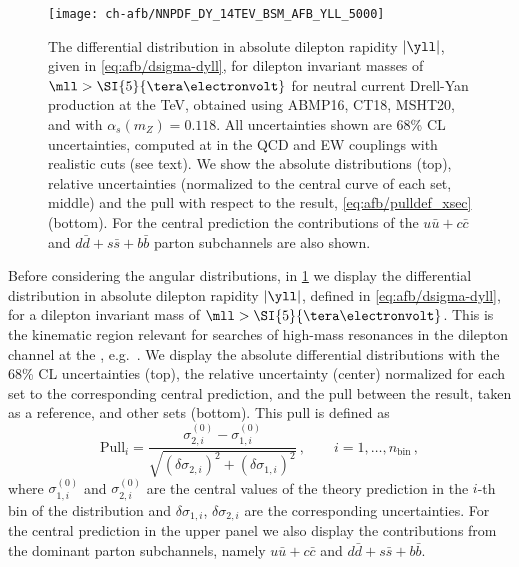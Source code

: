 \begin{figure}[!t]
 \centering
 \texttt{[image: ch-afb/NNPDF\_DY\_14TEV\_BSM\_AFB\_YLL\_5000]}
 \caption{The differential distribution in absolute dilepton rapidity $|\yll|$, given in
\cref{eq:afb/dsigma-dyll},
for dilepton invariant masses of $\mll > \SI{5}{\tera\electronvolt}$
for neutral current Drell-Yan production at the
 TeV,
obtained using ABMP16, CT18, MSHT20, and  \nnlo \pdfs with $\alpha_s(m_Z)=0.118$.
%
All
uncertainties shown are 68\% CL \pdf uncertainties, computed at \nlo
in the QCD and EW couplings with realistic cuts (see text).
We show the absolute distributions (top), relative uncertainties (normalized
to the central curve of each set, middle) and the pull with respect to the
 result, \cref{eq:afb/pulldef_xsec} (bottom).
%
For the central  prediction
the contributions of the $u\bar{u}+c\bar{c}$ and $d\bar{d}+s\bar{s}+b\bar{b}$
parton subchannels are also shown.
 \label{fig:afb/CMS_DY_14TEV_MLL_5000_rap}}
\end{figure}

Before considering the angular distributions, in
\cref{fig:afb/CMS_DY_14TEV_MLL_5000_rap} we display the 
differential distribution in absolute dilepton rapidity $|\yll|$,
defined in \cref{eq:afb/dsigma-dyll},
for a dilepton invariant mass of $\mll > \SI{5}{\tera\electronvolt}$.
%
This is the kinematic region relevant for searches of high-mass resonances
in the dilepton channel at the \lhc, e.g.~\cite{ATLAS:2019erb,Khachatryan:2016zqb}.
%
We display the absolute differential distributions with the 68\% CL \pdf uncertainties
(top), the relative \pdf uncertainty (center) normalized for each \pdf
set to the corresponding central prediction, and the pull between the
 result, taken as a reference, and other sets (bottom).
%
This pull is    defined as
    \begin{equation}
\label{eq:afb/pulldef_xsec}
{\text{Pull}}_i= \frac{ \sigma^{(0)}_{2,i} -\sigma^{(0)}_{1,i} }{
  \sqrt{ \left(  \delta \sigma_{2,i}\right)^2+\left(  \delta \sigma_{1,i}\right)^2 }} \, , \qquad i=1,\ldots,n_{\text{bin}} \, ,
\end{equation}
where  $\sigma^{(0)}_{1,i}$ and $\sigma^{(0)}_{2,i}$ are the central values of the
theory prediction in the $i$-th bin of the distribution and $\delta \sigma_{1,i}$, $\delta \sigma_{2,i}$ are
the corresponding \pdf uncertainties.
%
For the central  prediction in the upper panel we also display the
contributions from the dominant parton subchannels, namely
$u\bar{u}+c\bar{c}$ and $d\bar{d}+s\bar{s}+b\bar{b}$.


